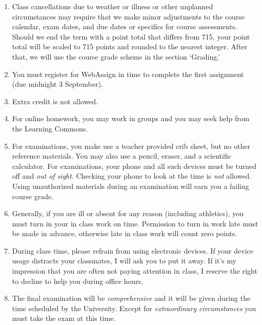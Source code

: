 \documentclass[12pt]{article}
\newcounter{ex}\setcounter{ex}{0}
\begin{document}
\begin{enumerate}

\item Class cancellations due to weather or illness or other 
unplanned circumstances may require that we make minor adjustments
to the course calendar, exam dates, and due dates or specifics for 
course assessments. Should we end the term with a point total that
differs from 715, your point total will be scaled to 715 points and rounded 
to the nearest integer. After that, we will use the course grade scheme in the 
section `Grading.'

\item You must register for WebAssign in time to complete the first 
assignment (due midnight 3 September).

\item Extra credit is not allowed. 

\item For online homework, you may work in groups and you may 
seek help from the Learning Commons. 

\item For examinations, you make use a teacher provided crib sheet, 
but no other reference materials. You may also use a pencil, eraser, 
and a scientific calculator. For examinations, your phone and all such
devices must be turned off and \emph{out of sight}. Checking your phone
to look at the time is \emph{not} allowed. Using unauthorized 
materials during an examination will earn you a failing course grade.

\item Generally, if you are ill or absent for any reason (including 
athletics), you must turn in your in class work on time. Permission to
turn in work late must be made in advance, otherwise late in class work 
will count zero points.


 

\item During class time, please refrain from using electronic devices. If your 
device usage distracts your classmates, I will ask you to put it away. If it's my 
impression that you are often not paying attention in class, I reserve the right to 
decline to help you during office hours.

\item The final examination will be \emph{comprehensive} and it will be given 
during the 
time scheduled by the University. Except for \emph{extraordinary circumstances}
you must take the exam at this time.



\end{enumerate}
\end{document}
